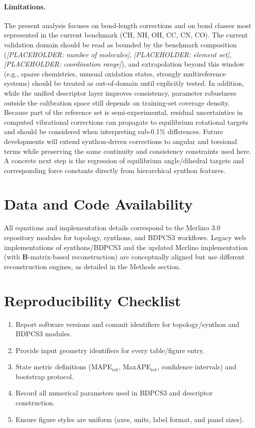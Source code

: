 \documentclass[journal=jctcce,manuscript=article]{achemso}
\begin{document}
\paragraph{Limitations.}
The present analysis focuses on bond-length corrections and on bond classes most represented in the current benchmark (CH, NH, OH, CC, CN, CO). The current validation domain should be read as bounded by the benchmark composition (\textit{[PLACEHOLDER: number of molecules]}, \textit{[PLACEHOLDER: element set]}, \textit{[PLACEHOLDER: coordination range]}), and extrapolation beyond this window (e.g., sparse chemistries, unusual oxidation states, strongly multireference systems) should be treated as out-of-domain until explicitly tested. In addition, while the unified descriptor layer improves consistency, parameter robustness outside the calibration space still depends on training-set coverage density.
Because part of the reference set is semi-experimental, residual uncertainties in computed vibrational corrections can propagate to equilibrium rotational targets and should be considered when interpreting sub-0.1\% differences.
Future developments will extend synthon-driven corrections to angular and torsional terms while preserving the same continuity and consistency constraints used here. A concrete next step is the regression of equilibrium angle/dihedral targets and corresponding force constants directly from hierarchical synthon features.

\section*{Data and Code Availability}
All equations and implementation details correspond to the Merlino 3.0 repository modules for topology, synthons, and BDPCS3 workflows. Legacy web implementations of synthons/BDPCS3 and the updated Merlino implementation (with $\mathbf{B}$-matrix-based reconstruction) are conceptually aligned but use different reconstruction engines, as detailed in the Methods section.

\section*{Reproducibility Checklist}
\begin{enumerate}
\item Report software versions and commit identifiers for topology/synthon and BDPCS3 modules.
\item Provide input geometry identifiers for every table/figure entry.
\item State metric definitions (MAPE$_\mathrm{rot}$, MaxAPE$_\mathrm{rot}$, confidence intervals) and bootstrap protocol.
\item Record all numerical parameters used in BDPCS3 and descriptor construction.
\item Ensure figure styles are uniform (axes, units, label format, and panel sizes).
\end{enumerate}
\end{document}
